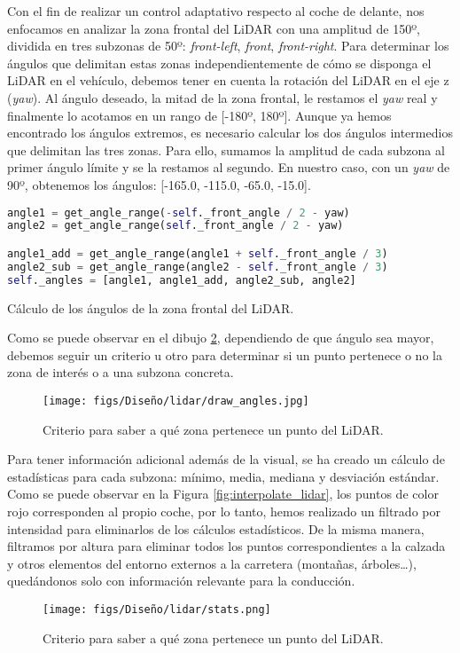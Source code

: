 Con el fin de realizar un control adaptativo respecto al coche de delante, nos enfocamos en analizar la zona frontal del \ac{LiDAR} con una amplitud de 150º, dividida en tres subzonas de 50º: \textit{front-left}, \textit{front}, \textit{front-right}. Para determinar los ángulos que delimitan estas zonas independientemente de cómo se disponga el \ac{LiDAR} en el vehículo, debemos tener en cuenta la rotación del \ac{LiDAR} en el eje z (\textit{yaw}). Al ángulo deseado, la mitad de la zona frontal, le restamos el \textit{yaw} real y finalmente lo acotamos en un rango de [-180º, 180º]. Aunque ya hemos encontrado los ángulos extremos, es necesario calcular los dos ángulos intermedios que delimitan las tres zonas. Para ello, sumamos la amplitud de cada subzona al primer ángulo límite y se la restamos al segundo. En nuestro caso, con un \textit{yaw} de 90º, obtenemos los ángulos: [-165.0, -115.0, -65.0, -15.0]. 
\begin{code}[h]
\begin{lstlisting}[language=Python]
angle1 = get_angle_range(-self._front_angle / 2 - yaw)
angle2 = get_angle_range(self._front_angle / 2 - yaw)

angle1_add = get_angle_range(angle1 + self._front_angle / 3)
angle2_sub = get_angle_range(angle2 - self._front_angle / 3)        
self._angles = [angle1, angle1_add, angle2_sub, angle2]
\end{lstlisting}
\caption[Cálculo de los ángulos de la zona frontal del \ac{LiDAR}]{Cálculo de los ángulos de la zona frontal del \ac{LiDAR}.}
\label{cod:angle_lidar}
\end{code}

Como se puede observar en el dibujo \ref{fig:dib_angle}, dependiendo de que ángulo sea mayor, debemos seguir un criterio u otro para determinar si un punto pertenece o no la zona de interés o a una subzona concreta.
\begin{figure}[ht]
  \centering
  \texttt{[image: figs/Diseño/lidar/draw\_angles.jpg]}
  \caption{Criterio para saber a qué zona pertenece un punto del \ac{LiDAR}.}
  \label{fig:dib_angle}
\end{figure}

Para tener información adicional además de la visual, se ha creado un cálculo de estadísticas para cada subzona: mínimo, media, mediana y desviación estándar. Como se puede observar en la Figura \ref{fig:interpolate_lidar}, los puntos de color rojo corresponden al propio coche, por lo tanto, hemos realizado un filtrado por intensidad para eliminarlos de los cálculos estadísticos. De la misma manera, filtramos por altura para eliminar todos los puntos correspondientes a la calzada y otros elementos del entorno externos a la carretera (montañas, árboles…), quedándonos solo con información relevante para la conducción.
\begin{figure}[ht]
  \centering
  \texttt{[image: figs/Diseño/lidar/stats.png]}
  \caption{Criterio para saber a qué zona pertenece un punto del \ac{LiDAR}.}
  \label{fig:dib_angle}
\end{figure}

